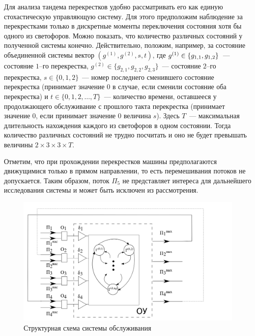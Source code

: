 \documentclass[11pt]{ubs}
\newcommand*{\hm}[1]{#1\nobreak\discretionary{}%
	{\hbox{$\mathsurround=0pt #1$}}{}}%
\begin{document}
Для анализа тандема перекрестков удобно рассматривать его как единую стохастическую управляющую систему. Для этого предположим наблюдение за перекрестками только в дискретные моменты переключения состояния хотя бы одного из светофоров. Можно показать, что количество различных состояний у полученной системы конечно. Действительно, положим, например, за состояние объединенной системы вектор $(g^{(1)},g^{(2)}, s, t)$, где $g^{(1)}\hm\in \{g_{1,1},g_{1,2}\}$~--- состояние $1$--го перекрестка, $g^{(2)}\in \{g_{2,1},g_{2,2},g_{2,3}\}$~--- состояние $2$--го перекрестка, $s \in \{0, 1, 2\}$~--- номер последнего сменившего состояние перекрестка (принимает значение $0$ в случае, если сменили состояние оба перекрестка) и $t \in \{0, 1, 2, \ldots, T\}$~--- количество времени, оставшееся у продолжающего обслуживание с прошлого такта перекрестка (принимает значение $0$, если принимает значение $0$ величина $s$). Здесь $T$~--- максимальная длительность нахождения каждого из светофоров в одном состоянии. Тогда количество различных состояний не трудно посчитать и оно не будет превышать величины  $2\times 3 \times 3 \times T$.

Отметим, что при прохождении перекрестков машины предполагаются движущимися только в прямом направлении, то есть перемешивания потоков не допускается. Таким образом, поток $\Pi_5$ не представляет интереса для дальнейшего исследования системы и может быть исключен из рассмотрения.
\begin{figure}[h]
\includegraphics[scale=0.3]{SystemScheme.png} 
\caption{Структурная схема системы обслуживания}
\label{SystemScheme}
\end{figure}
\end{document}
